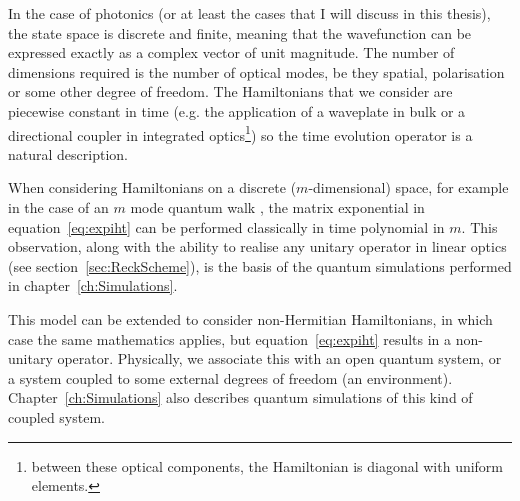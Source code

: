In the case of photonics (or at least the cases that I will discuss in this
thesis), the state space is discrete and finite, meaning that the wavefunction
can be expressed exactly as a complex vector of unit magnitude. The number of
dimensions required is the number of optical modes, be they spatial,
polarisation or some other degree of freedom. The Hamiltonians that we consider
are piecewise constant in time (e.g. the application of a waveplate in bulk or
a directional coupler in integrated optics\footnote{between these optical
components, the Hamiltonian is diagonal with uniform elements.}) so the time
evolution operator is a natural description.

When considering Hamiltonians on a discrete (\(m\)-dimensional) space, for
example in the case of an \(m\) mode quantum walk \cite{walks-peruzzo}, the
matrix exponential in equation~\ref{eq:expiht} can be performed classically in
time polynomial in \(m\). This observation, along with the ability to realise
any unitary operator in linear optics (see section~\ref{sec:ReckScheme}), is the
basis of the quantum simulations performed in chapter~\ref{ch:Simulations}.

This model can be extended to consider non-Hermitian Hamiltonians, in which
case the same mathematics applies, but equation~\ref{eq:expiht} results in a 
non-unitary operator. Physically, we associate this with an open quantum system,
or a system coupled to some external degrees of freedom (an environment).
Chapter~\ref{ch:Simulations} also describes quantum simulations of this kind of
coupled system.

